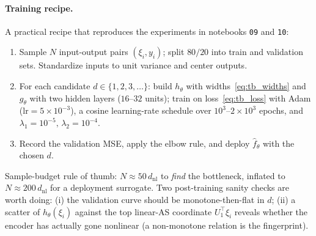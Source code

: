 \documentclass[11pt,a4paper]{report}
\begin{document}
\paragraph{Training recipe.}
A practical recipe that reproduces the experiments in notebooks \texttt{09} and \texttt{10}:
\begin{enumerate}[itemsep=2pt]
\item Sample $N$ input-output pairs $(\xi_i, y_i)$; split $80/20$ into train and validation sets.  Standardize inputs to unit variance and center outputs.
\item For each candidate $d \in \{1, 2, 3, \ldots\}$: build $h_\theta$ with widths~\eqref{eq:tb_widths} and $g_\theta$ with two hidden layers ($16$--$32$ units); train on loss~\eqref{eq:tb_loss} with Adam ($\text{lr} = 5 \times 10^{-3}$), a cosine learning-rate schedule over $10^3$--$2 \times 10^3$ epochs, and $\lambda_1 = 10^{-5},\, \lambda_2 = 10^{-4}$.
\item Record the validation MSE, apply the elbow rule, and deploy $\hat f_\theta$ with the chosen $d$.
\end{enumerate}
Sample-budget rule of thumb: $N \approx 50\, d_{\mathrm{nl}}$ to \emph{find} the bottleneck, inflated to $N \approx 200\, d_{\mathrm{nl}}$ for a deployment surrogate.  Two post-training sanity checks are worth doing: (i) the validation curve should be monotone-then-flat in $d$; (ii) a scatter of $h_\theta(\xi_i)$ against the top linear-AS coordinate $U_1^\top \xi_i$ reveals whether the encoder has actually gone nonlinear (a non-monotone relation is the fingerprint).
\end{document}
